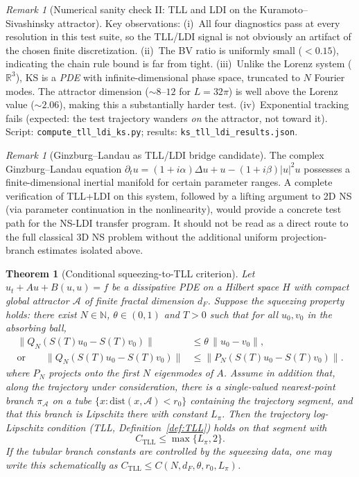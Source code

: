 \documentclass[12pt,a4paper]{article}
\theoremstyle{definition}
\theoremstyle{plain}
\newtheorem{theorem}[definition]{Theorem}
\theoremstyle{remark}
\newtheorem{remark}[definition]{Remark}
\newcommand{\dist}{\mathrm{dist}}
\begin{document}
\begin{remark}[Numerical sanity check II: TLL and LDI on the Kuramoto--Sivashinsky attractor]
Key observations: (i)~All four diagnostics pass at every resolution in this
test suite, so the TLL/LDI signal is not obviously an artifact of the chosen
finite discretization.
(ii)~The BV ratio is uniformly small ($< 0.15$), indicating the chain rule
bound is far from tight.
(iii)~Unlike the Lorenz system ($\mathbb{R}^3$), KS is a \emph{PDE}
with infinite-dimensional phase space, truncated to $N$ Fourier modes.
The attractor dimension ($\sim 8$--$12$ for $L = 32\pi$) is well above
the Lorenz value ($\sim 2.06$), making this a substantially harder test.
(iv)~Exponential tracking fails (expected: the test trajectory wanders
\emph{on} the attractor, not toward it).
Script: \texttt{compute\_tll\_ldi\_ks.py}; results: \texttt{ks\_tll\_ldi\_results.json}.
\end{remark}

\begin{remark}[Ginzburg--Landau as TLL/LDI bridge candidate]
\label{rem:ginzburg-landau}
The complex Ginzburg--Landau equation $\partial_t u = (1+i\alpha)\Delta u + u - (1+i\beta)|u|^2 u$ possesses a finite-dimensional inertial manifold for certain parameter ranges. A complete verification of TLL+LDI on this system, followed by a lifting argument to 2D NS (via parameter continuation in the nonlinearity), would provide a concrete test path for the NS-LDI transfer program. It should not be read as a direct route to the full classical 3D NS problem without the additional uniform projection-branch estimates isolated above.
\end{remark}

\begin{theorem}[Conditional squeezing-to-TLL criterion]\label{thm:squeezing-tll}
Let $u_t + Au + B(u,u) = f$ be a dissipative PDE on a Hilbert space $H$
with compact global attractor $\mathcal{A}$ of finite fractal dimension $d_F$.
Suppose the squeezing property holds: there exist $N \in \mathbb{N}$,
$\theta \in (0,1)$ and $T > 0$ such that for all $u_0, v_0$ in the
absorbing ball,
\[
\begin{aligned}
  \|Q_N(S(T)u_0 - S(T)v_0)\|
  &\leq \theta\,\|u_0 - v_0\|,\\
  \text{or}\qquad
  \|Q_N(S(T)u_0 - S(T)v_0)\|
  &\leq \|P_N(S(T)u_0 - S(T)v_0)\|.
\end{aligned}
\]
where $P_N$ projects onto the first $N$ eigenmodes of $A$.
Assume in addition that, along the trajectory under consideration,
there is a single-valued nearest-point branch
$\pi_{\mathcal{A}}$ on a tube
$\{x:\dist(x,\mathcal{A})<r_0\}$ containing the trajectory segment,
and that this branch is Lipschitz there with constant $L_\pi$.
Then the trajectory log-Lipschitz condition
(TLL, Definition~\ref{def:TLL}) holds on that segment with
\[
  C_{\mathrm{TLL}} \leq \max\{L_\pi,2\}.
\]
If the tubular branch constants are controlled by the squeezing data,
one may write this schematically as
$C_{\mathrm{TLL}}\le C(N,d_F,\theta,r_0,L_\pi)$.
\end{theorem}
\end{document}
